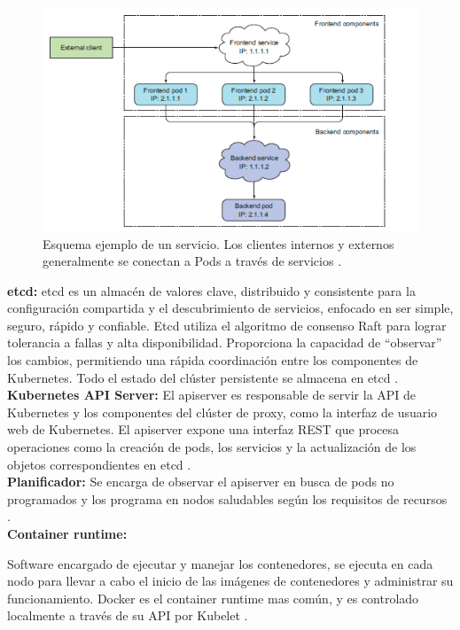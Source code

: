 \begin{figure}[htpb!]
	\centering
	\includegraphics[width=0.8\columnwidth]{images/kubernetes03.png}
	\caption{Esquema ejemplo de un servicio. Los clientes internos y externos generalmente se conectan a Pods a través de servicios \cite{BOOK01}.}
	\label{fig:kub03}
\end{figure}

\textbf{etcd:} etcd es un almacén de valores clave, distribuido y consistente para la configuración compartida y el descubrimiento de servicios, enfocado en ser simple, seguro, rápido y confiable. Etcd utiliza el algoritmo de consenso Raft para lograr tolerancia a fallas y alta disponibilidad. Proporciona la capacidad de ``observar'' los cambios, permitiendo una rápida coordinación entre los componentes de Kubernetes. Todo el estado del clúster persistente se almacena en etcd \cite{BOOK04}.\\


\textbf{Kubernetes API Server:} El apiserver es responsable de servir la API de Kubernetes y los componentes del clúster de proxy, como la interfaz de usuario web de Kubernetes. El apiserver expone una interfaz REST que procesa operaciones como la creación de pods, los servicios y la actualización de los objetos correspondientes en etcd \cite{BOOK04}.\\

\textbf{Planificador:} Se encarga de observar el apiserver en busca de pods no programados y los programa en nodos saludables según los requisitos de recursos \cite{BOOK04}.\\

\textbf{Container runtime:} 

Software encargado de ejecutar y manejar los contenedores, se ejecuta en cada nodo para llevar a cabo el inicio de las imágenes de contenedores y administrar su funcionamiento. Docker es el container runtime mas común, y es controlado localmente a través de su API por Kubelet \cite{BOOK04}.\\



